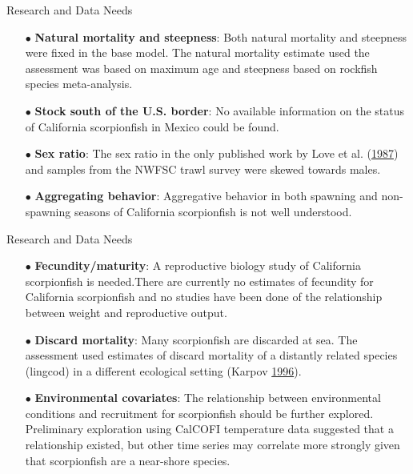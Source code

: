 \documentclass[ignorenonframetext,]{beamer}
\begin{document}
\begin{frame}{Research and Data Needs}

\begin{itemize}
\item[$\bullet$] \textbf{Natural mortality and steepness}: Both natural mortality and steepness were 
fixed in the base model.  The natural mortality estimate used the assessment 
was based on maximum age and steepness based on rockfish species meta-analysis.

\item[$\bullet$] \textbf{Stock south of the U.S. border}:  No available information on the status of California scorpionfish in Mexico could be found.

\item[$\bullet$] \textbf{Sex ratio}:  The sex ratio in the only published work by Love et al.
(\protect\hyperlink{ref-Love1987}{1987}) and samples 
from the NWFSC trawl survey were skewed towards males.

\item[$\bullet$] \textbf{Aggregating behavior}: Aggregative behavior in both spawning and 
non-spawning seasons of California scorpionfish is not well understood.

\end{itemize}

\end{frame}

\begin{frame}{Research and Data Needs}

\begin{itemize}

\item[$\bullet$] \textbf{Fecundity/maturity}: A reproductive biology study of California 
scorpionfish is needed.There are currently no estimates of fecundity 
for California scorpionfish and no studies have been done of the relationship between weight and reproductive 
output.

\item[$\bullet$] \textbf{Discard mortality}: Many scorpionfish are discarded at sea. The assessment 
used estimates of discard mortality of a distantly related species (lingcod) 
in a different ecological setting (Karpov \protect\hyperlink{ref-Karpov1996}{1996}). 


\item[$\bullet$] \textbf{Environmental covariates}: The relationship between environmental 
conditions and recruitment for scorpionfish should be further explored. Preliminary 
exploration using CalCOFI temperature data suggested that a relationship existed, 
but other time series may correlate more strongly given that scorpionfish are a 
near-shore species.

\end{itemize}

\end{frame}
\end{document}
